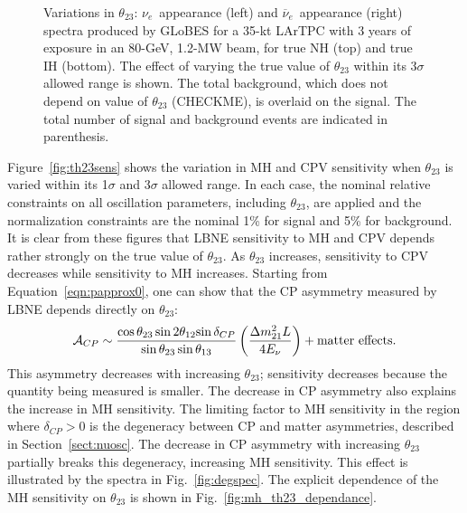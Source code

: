 \documentclass[letterpaper,11pt]{article}
\begin{document}
\begin{figure}[!htb]
  \caption{
  Variations in $\theta_{23}$:
  $\nu_e$~appearance (left) and $\overline{\nu}_e$~appearance (right) spectra 
  produced by GLoBES for a 35-kt LArTPC with 3 years of 
  exposure in an 80-GeV, 1.2-MW beam,  for true NH (top) and true IH (bottom).  
  The effect of varying the true
  value of $\theta_{23}$ within its 3$\sigma$ allowed range is shown. 
  The total background, which does not depend on value of $\theta_{23}$ (CHECKME), 
  is overlaid on the signal. The total number
  of signal and background events are indicated in parenthesis.}
  \label{fig:th23spec}
\end{figure}
Figure~\ref{fig:th23sens} shows the variation in MH and CPV sensitivity when $\theta_{23}$
is varied within its 1$\sigma$ and 3$\sigma$ allowed range. In each case, the 
nominal relative constraints on all oscillation parameters, including $\theta_{23}$, 
are applied and the normalization constraints are the nominal
1\% for signal and 5\% for background. It is clear from these figures that LBNE 
sensitivity to MH and CPV depends rather strongly on the true value of $\theta_{23}$.
As $\theta_{23}$ increases, sensitivity to CPV decreases while sensitivity to
MH increases. Starting from Equation~\ref{eqn:papprox0}, one can show
that the CP asymmetry measured by LBNE depends directly on
$\theta_{23}$:
\begin{equation}
\mathcal{A}_{CP} \sim \frac{\cos \theta_{23} \sin 2 \theta_{12}
  {\sin \delta_{CP}}}{\sin \theta_{23} \sin \theta_{13}}
\left(\frac{\Delta m^2_{21} L}{ 4 E_{\nu}}\right) + {\rm matter
  \ effects}.
\end{equation}
This asymmetry decreases with increasing $\theta_{23}$; sensitivity decreases
because the quantity being measured is smaller. The decrease in CP asymmetry also
explains the increase in MH sensitivity. The limiting factor to MH sensitivity
in the region where $\delta_{CP}>0$ is the degeneracy between CP and matter
asymmetries, described in Section~\ref{sect:nuosc}. The decrease in CP asymmetry
with increasing $\theta_{23}$ partially breaks this degeneracy, increasing MH
sensitivity. This effect is illustrated by the spectra in Fig.~\ref{fig:degspec}.
The explicit dependence of the MH sensitivity on $\theta_{23}$ is shown in 
Fig.~\ref{fig:mh_th23_dependance}.
%
\end{document}
